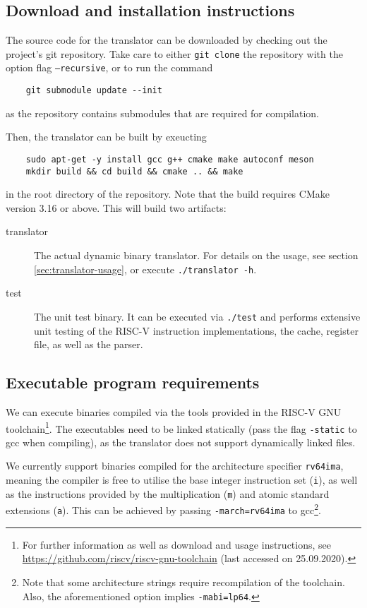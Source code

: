 \subsection{Download and installation instructions}
The source code for the translator can be downloaded by checking out the project's git repository.
Take care to either \texttt{git clone} the repository with the option flag \texttt{--recursive}, or to run the command
\begin{lstlisting}
	git submodule update --init
\end{lstlisting}
as the repository contains submodules that are required for compilation.

Then, the translator can be built by exeucting
\begin{lstlisting}
	sudo apt-get -y install gcc g++ cmake make autoconf meson
	mkdir build && cd build && cmake .. && make
\end{lstlisting}
in the root directory of the repository.
Note that the build requires CMake version 3.16 or above.
This will build two artifacts:
\begin{description}
	\item[translator] The actual dynamic binary translator.
	For details on the usage, see section \vref{sec:translator-usage}, or execute \texttt{./translator -h}.
	
	\item[test] The unit test binary.
	It can be executed via \texttt{./test} and performs extensive unit testing of the RISC-V instruction implementations, the cache, register file, as well as the parser.
\end{description}

\subsection{Executable program requirements}
We can execute binaries compiled via the tools provided in the RISC-V GNU toolchain\footnote{For further information as well as download and usage instructions, see \url{https://github.com/riscv/riscv-gnu-toolchain} (last accessed on 25.09.2020).}.
The executables need to be linked statically (pass the flag \texttt{-static} to gcc when compiling), as the translator does not support dynamically linked files.

We currently support binaries compiled for the architecture specifier \texttt{rv64ima}, meaning the compiler is free to utilise the base integer instruction set (\texttt{i}), as well as the instructions provided by the multiplication (\texttt{m}) and atomic standard extensions (\texttt{a}).
This can be achieved by passing \texttt{-march=rv64ima} to gcc\footnote{Note that some architecture strings require recompilation of the toolchain. Also, the aforementioned option implies \texttt{-mabi=lp64}.}.


